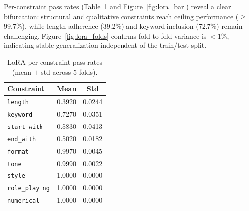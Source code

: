 \documentclass[10pt]{article}
\begin{document}
Per-constraint pass rates (Table~\ref{tab:lora_per_constraint} and
Figure~\ref{fig:lora_bar}) reveal a clear bifurcation: structural and
qualitative constraints reach ceiling performance ($\geq$99.7\%), while
length adherence (39.2\%) and keyword inclusion (72.7\%) remain
challenging. Figure~\ref{fig:lora_folds} confirms fold-to-fold variance is
$<1\%$, indicating stable generalization independent of the train/test
split.

\begin{table}[H]
\centering
\caption{LoRA per-constraint pass rates (mean $\pm$ std across 5 folds).}
\label{tab:lora_per_constraint}
\small
\begin{tabular}{lcc}
\toprule
\textbf{Constraint} & \textbf{Mean} & \textbf{Std} \\
\midrule
\texttt{length}        & 0.3920 & 0.0244 \\
\texttt{keyword}       & 0.7270 & 0.0351 \\
\texttt{start\_with}   & 0.5830 & 0.0413 \\
\texttt{end\_with}     & 0.5020 & 0.0182 \\
\texttt{format}        & 0.9970 & 0.0045 \\
\texttt{tone}          & 0.9990 & 0.0022 \\
\texttt{style}         & 1.0000 & 0.0000 \\
\texttt{role\_playing} & 1.0000 & 0.0000 \\
\texttt{numerical}     & 1.0000 & 0.0000 \\
\bottomrule
\end{tabular}
\end{table}
\end{document}
